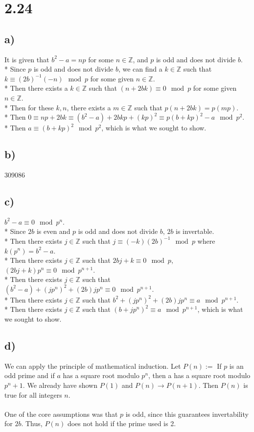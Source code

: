 \documentclass{article}
\begin{document}
\section{2.24}
\subsection{a)}
It is given that $b^2 - a = np$ for some $n \in \mathbb{Z}$, and $p$ is odd and does not divide $b$.
\\*
Since $p$ is odd and does not divide $b$,
we can find a $k \in \mathbb{Z}$ such that
$k \equiv (2b)^{-1}(-n) \mod{p}$ for some given $n \in \mathbb{Z}$.
\\*
Then there exists a $k \in \mathbb{Z}$ such that
$(n + 2bk) \equiv 0 \mod{p}$ for some given $n \in \mathbb{Z}$.
\\*
Then for these $k, n$,
there exists a $m \in \mathbb{Z}$ such that $p(n + 2bk) = p(mp)$.
\\*
Then $0 \equiv np + 2bk \equiv (b^2 - a) + 2bkp + (kp)^2
\equiv p(b + kp)^2 - a \mod{p^2}$.
\\*
Then $a \equiv (b + kp)^2 \mod{p^2}$, which is what we sought to show.

\subsection{b)}
309086

\subsection{c)}
$b^2 - a \equiv 0 \mod{p^n}$.
\\*
Since $2b$ is even and $p$ is odd and does not divide $b$,
$2b$ is invertable.
\\*
Then there exists $j \in \mathbb{Z}$ such that
$j \equiv (-k)(2b)^{-1} \mod{p}$ where
$k(p^n) = b^2 - a$.
\\*
Then there exists $j \in \mathbb{Z}$ such that
$2bj + k \equiv 0 \mod{p}$, $(2bj + k)p^n \equiv 0 \mod{p^{n+1}}$.
\\*
Then there exists $j \in \mathbb{Z}$ such that
$(b^2 - a) + (jp^n)^2 + (2b)jp^n \equiv 0 \mod{p^{n+1}}$.
\\*
Then there exists $j \in \mathbb{Z}$ such that
$b^2 + (jp^n)^2 + (2b)jp^n \equiv a \mod{p^{n+1}}$.
\\*
Then there exists $j \in \mathbb{Z}$ such that
$(b + jp^n)^2 \equiv a \mod{p^{n+1}}$, which is what we sought to show.

\subsection{d)}
We can apply the principle of mathematical induction.
Let $P(n) := $ If $p$ is an odd prime and if $a$ has a square root
modulo $p^n$, then a has a square root modulo $p^n+1$. We already
have shown $P(1)$ and $P(n) \rightarrow P(n+1)$. Then $P(n)$ is
true for all integers $n$.
\\\\
One of the core assumptions was that $p$ is odd, since this
guarantees invertability for $2b$. Thus, $P(n)$ does not hold
if the prime used is 2.
\end{document}
